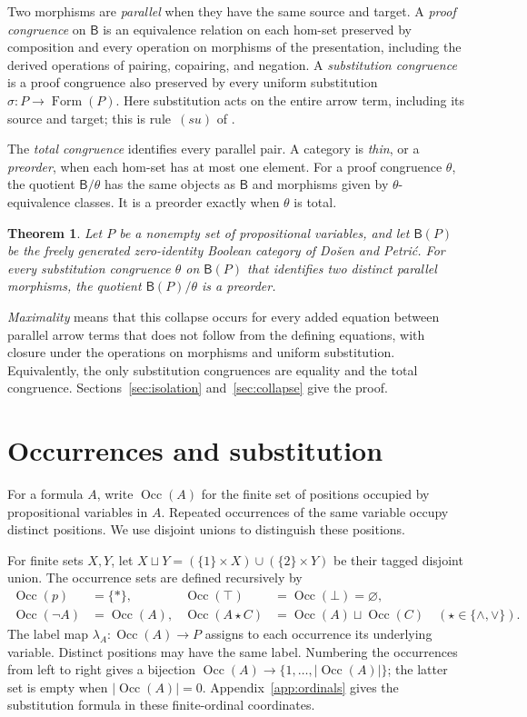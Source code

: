 \documentclass[11pt]{article}
\newtheorem{theorem}{Theorem}[section]
\newcommand{\B}{\mathsf B}
\newcommand{\Occ}{\operatorname{Occ}}
\newcommand{\FormulaSet}{\operatorname{Form}}
\begin{document}
Two morphisms are \emph{parallel} when they have the same source and
target. A \emph{proof congruence} on $\B$ is an equivalence relation
on each hom-set preserved by composition and every operation on morphisms
of the presentation, including the derived operations of pairing,
copairing, and negation.
A \emph{substitution congruence} is a proof congruence also preserved
by every uniform substitution $\sigma:P\to\FormulaSet(P)$.
Here substitution acts on the entire arrow term, including its source
and target; this is rule~$(su)$ of \cite[\S2.7, p.~51]{DP}.

The \emph{total congruence} identifies every parallel pair. A category
is \emph{thin}, or a \emph{preorder}, when each hom-set has at most one
element. For a proof congruence $\theta$, the quotient $\B/\theta$
has the same objects as $\B$ and morphisms given by $\theta$-equivalence
classes. It is a preorder exactly when $\theta$ is total.

\begin{theorem}\label{thm:main}
Let $P$ be a nonempty set of propositional variables, and let
$\B(P)$ be the freely generated zero-identity Boolean category of
Do\v{s}en and Petri\'c. For every substitution congruence $\theta$
on $\B(P)$ that identifies two distinct parallel morphisms, the
quotient $\B(P)/\theta$ is a preorder.
\end{theorem}

\emph{Maximality} means that this collapse occurs for every added
equation between parallel arrow terms that does not follow from the
defining equations, with closure under the operations on morphisms and
uniform substitution. Equivalently, the only substitution
congruences are equality and the total congruence.
Sections~\ref{sec:isolation} and~\ref{sec:collapse} give the proof.

\section{Occurrences and substitution}\label{sec:occurrences}

For a formula $A$, write $\Occ(A)$ for the finite set of positions
occupied by propositional variables in $A$. Repeated occurrences of the
same variable occupy distinct positions. We use disjoint unions to
distinguish these positions.

For finite sets $X,Y$, let
$X\sqcup Y=(\{1\}\times X)\cup(\{2\}\times Y)$ be their tagged
disjoint union. The occurrence sets are defined recursively by
\[
 \begin{aligned}
 \Occ(p)&=\{*\},&
 \Occ(\top)&=\Occ(\bot)=\varnothing,\\
 \Occ(\neg A)&=\Occ(A),&
 \Occ(A\mathbin\star C)&=\Occ(A)\sqcup\Occ(C)
       \quad(\star\in\{\wedge,\vee\}).
 \end{aligned}
\]
The label map $\lambda_A:\Occ(A)\to P$ assigns to each occurrence
its underlying variable. Distinct positions may have the same label.
Numbering the occurrences from left to right gives a bijection
$\Occ(A)\to\{1,\ldots,|\Occ(A)|\}$; the latter set is empty when
$|\Occ(A)|=0$. Appendix~\ref{app:ordinals} gives the substitution
formula in these finite-ordinal coordinates.
\end{document}
